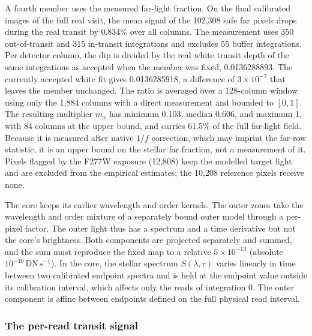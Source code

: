 A fourth member uses the measured far-light fraction. On the final
calibrated images of the full real visit, the mean signal of the
102{,}308 safe far pixels drops during the real transit by 0.834\% over
all columns. The measurement uses 350 out-of-transit and 315 in-transit
integrations and excludes 55 buffer integrations. Per detector column, the dip is
divided by the real white transit depth of the same integrations as
accepted when the member was fixed, 0.0136288893. The currently accepted
white fit gives 0.0136285918, a difference of $3\times10^{-7}$ that
leaves the member unchanged. The ratio is averaged over a 128-column
window using only the 1{,}884 columns with a direct measurement and
bounded to $[0,1]$. The resulting multiplier $m_x$ has minimum 0.103,
median 0.606, and maximum 1, with 84 columns at the upper bound, and
carries 61.5\% of the full far-light field. Because it is measured
after native $1/f$ correction, which may imprint the far-row statistic,
it is an upper bound on the stellar far fraction, not a measurement of
it. Pixels flagged by the F277W exposure (12{,}808) keep the modelled
target light and are excluded from the empirical estimates; the
10{,}208 reference pixels receive none.

The core keeps its earlier wavelength and order kernels. The outer zones
take the wavelength and order mixture of a separately bound outer model
through a per-pixel factor. The outer light thus has a spectrum and a
time derivative but not the core's brightness. Both components are
projected separately and summed, and the sum must reproduce the fixed
map to a relative $5\times10^{-13}$ (absolute
$10^{-10}\,\mathrm{DN\,s^{-1}}$). In the core, the stellar spectrum
$S(\lambda,\tau)$ varies linearly in time between two calibrated
endpoint spectra and is held at the endpoint value outside its
calibration interval, which affects only the reads of integration 0. The
outer component is affine between endpoints defined on the full physical
read interval.

\subsubsection{The per-read transit signal}


